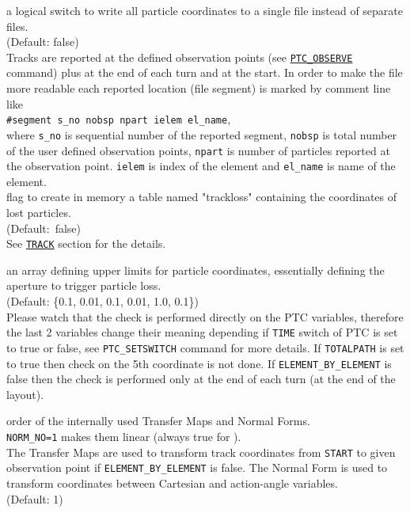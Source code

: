 \begin{madlist}
   \label{opt:onetable} a logical switch to write all 
	particle coordinates to a single file instead of separate files.\\
	(Default: false) \\
	Tracks are reported at the defined observation points
	(see \hyperref[sec:ptc-observe]{\texttt{PTC\_OBSERVE}} command)
	plus at the end of each turn and at the start.
	In order to make the file more readable each reported location (file segment)
	is marked by comment line like \\
	\texttt{\#segment s\_no nobsp npart ielem el\_name}, \\ where 
	\texttt{s\_no} is sequential number of the reported segment, 
	\texttt{nobsp} is total number of the user defined observation points, 
	\texttt{npart} is number of particles reported at the observation point.
	\texttt{ielem} is index of the element and 
	\texttt{el\_name} is name of the element.
	\\

    flag to create in memory a table named "trackloss"
   containing the coordinates of lost particles.\\
   (Default:~false) \\
   See \hyperref[sec:track]{\texttt{TRACK}} section for the details.

    an array defining upper limits for particle
   coordinates, essentially defining the aperture to trigger particle
   loss. \\ 
   (Default: \{0.1, 0.01, 0.1, 0.01, 1.0, 0.1\}) \\
   Please watch that the check is performed directly on the PTC variables, 
   therefore the last 2 variables change their meaning depending if 
   \texttt{TIME} switch of PTC is set to true or false, see 
   \texttt{PTC\_SETSWITCH} command for more details.
   If \texttt{TOTALPATH} is set to true then check on the 5th coordinate
   is not done.
   If \texttt{ELEMENT\_BY\_ELEMENT} is false then the check is performed
   only at the end of each turn (at the end of the layout). 
   

    order of the internally used Transfer Maps and Normal Forms.\\
   \texttt{NORM\_NO=1} makes them linear (always true for \madx). \\
   The Transfer Maps are used to transform track coordinates from \texttt{START} to given observation point
   if \texttt{ELEMENT\_BY\_ELEMENT} is false.
   The Normal Form is used to transform coordinates between Cartesian and action-angle variables.
   \\ (Default: 1)


\end{madlist}
